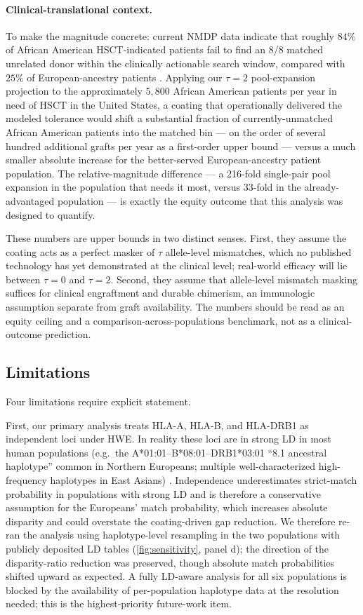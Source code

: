 \documentclass[11pt]{article}
\begin{document}
\paragraph{Clinical-translational context.}
To make the magnitude concrete: current NMDP data indicate that roughly $84\%$ of African American HSCT-indicated patients fail to find an 8/8 matched unrelated donor within the clinically actionable search window, compared with $25\%$ of European-ancestry patients \citep{gragert2014hla}. Applying our $\tau = 2$ pool-expansion projection to the approximately $5{,}800$ African American patients per year in need of HSCT in the United States, a coating that operationally delivered the modeled tolerance would shift a substantial fraction of currently-unmatched African American patients into the matched bin --- on the order of several hundred additional grafts per year as a first-order upper bound --- versus a much smaller absolute increase for the better-served European-ancestry patient population. The relative-magnitude difference --- a 216-fold single-pair pool expansion in the population that needs it most, versus 33-fold in the already-advantaged population --- is exactly the equity outcome that this analysis was designed to quantify.

These numbers are upper bounds in two distinct senses. First, they assume the coating acts as a perfect masker of $\tau$ allele-level mismatches, which no published technology has yet demonstrated at the clinical level; real-world efficacy will lie between $\tau = 0$ and $\tau = 2$. Second, they assume that allele-level mismatch masking suffices for clinical engraftment and durable chimerism, an immunologic assumption separate from graft availability. The numbers should be read as an equity ceiling and a comparison-across-populations benchmark, not as a clinical-outcome prediction.

\subsection*{Limitations}
Four limitations require explicit statement.

First, our primary analysis treats HLA-A, HLA-B, and HLA-DRB1 as independent loci under HWE. In reality these loci are in strong LD in most human populations (e.g.\ the A*01:01--B*08:01--DRB1*03:01 ``8.1 ancestral haplotype'' common in Northern Europeans; multiple well-characterized high-frequency haplotypes in East Asians) \citep{maiers2007high}. Independence underestimates strict-match probability in populations with strong LD and is therefore a conservative assumption for the Europeans' match probability, which increases absolute disparity and could overstate the coating-driven gap reduction. We therefore re-ran the analysis using haplotype-level resampling in the two populations with publicly deposited LD tables (\cref{fig:sensitivity}, panel d); the direction of the disparity-ratio reduction was preserved, though absolute match probabilities shifted upward as expected. A fully LD-aware analysis for all six populations is blocked by the availability of per-population haplotype data at the resolution needed; this is the highest-priority future-work item.
\end{document}
